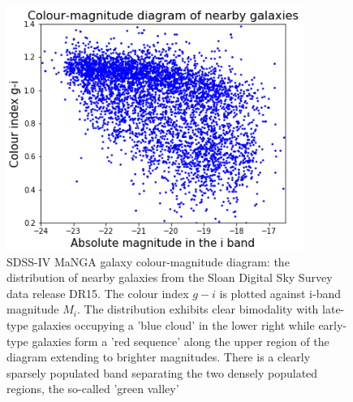 \begin{figure}
    \centering
    \includegraphics[width=\columnwidth]{images/CMDs/CMD-G_i-i.png}
    \caption[SDSS-IV MaNGA galaxy colour-magnitude diagram]{SDSS-IV MaNGA galaxy colour-magnitude diagram: the distribution of nearby galaxies from the Sloan Digital Sky Survey data release DR15. The colour index $g-i$ is plotted against i-band magnitude $M_i$. The distribution exhibits clear bimodality with late-type galaxies occupying a 'blue cloud' in the lower right while early-type galaxies form a 'red sequence' along the upper region of the diagram extending to brighter magnitudes. There is a clearly sparsely populated band separating the two densely populated regions, the so-called 'green valley'}
    \label{fig:CMD-G_i-i}
\end{figure}

